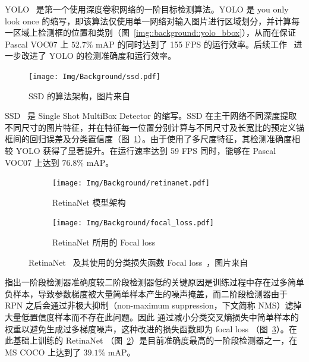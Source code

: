 YOLO~\citep{redmon2016you} 是第一个使用深度卷积网络的一阶目标检测算法。YOLO 是 you only look once 的缩写，即该算法仅使用单一网络对输入图片进行区域划分，并计算每一区域上检测框的位置和类别（图~\ref{img::background::yolo_bbox}），从而在保证 Pascal VOC07 上 $52.7\%$ mAP 的同时达到了 155 FPS 的运行效率。后续工作~\citet{redmon2017yolo9000, redmon2018yolov3} 进一步改进了 YOLO 的检测准确度和运行效率。

\begin{figure}[htb]
  \centering
  \texttt{[image: Img/Background/ssd.pdf]}
  \caption{SSD 的算法架构，图片来自~\citet{liu2016ssd}}
  \label{img::background::ssd}
\end{figure}

SSD~\citep{liu2016ssd} 是 Single Shot MultiBox Detector 的缩写。SSD 在主干网络不同深度提取不同尺寸的图片特征，并在特征每一位置分别计算与不同尺寸及长宽比的预定义锚框间的回归误差及分类置信度（图~\ref{img::background::ssd}）。由于使用了多尺度特征，其检测准确度相较 YOLO 获得了显著提升。在运行速率达到 59 FPS 同时，能够在 Pascal VOC07 上达到 $76.8\%$ mAP。

\begin{figure}[htb]
  \centering
  \begin{subfigure}[t]{0.65\columnwidth}
    \texttt{[image: Img/Background/retinanet.pdf]}
    \caption{RetinaNet 模型架构}
    \label{img::background::retina_net}
  \end{subfigure}
  \quad
  \begin{subfigure}[t]{0.3\columnwidth}
    \texttt{[image: Img/Background/focal\_loss.pdf]}
    \caption{RetinaNet 所用的 Focal loss}
    \label{img::background::focal_loss}
  \end{subfigure}
  \caption{RetinaNet~ 及其使用的分类损失函数 Focal loss~，图片来自~\citet{lin2017focal}}
  \label{img::background::retinanet_focalloss}
\end{figure}

\citet{lin2017focal} 指出一阶段检测器准确度较二阶段检测器低的关键原因是训练过程中存在过多简单负样本，导致参数梯度被大量简单样本产生的噪声掩盖，而二阶段检测器由于 RPN 之后会通过非极大抑制（non-maximum suppression，下文简称 NMS）滤掉大量低置信度样本而不存在此问题。因此 \citet{lin2017focal} 通过减小分类交叉熵损失中简单样本的权重以避免生成过多梯度噪声，这种改进的损失函数即为 focal loss （图~\ref{img::background::focal_loss}）。在此基础上训练的 RetinaNet （图~\ref{img::background::retina_net}）是目前准确度最高的一阶段检测器之一，在 MS COCO 上达到了 $39.1\%$ mAP。
